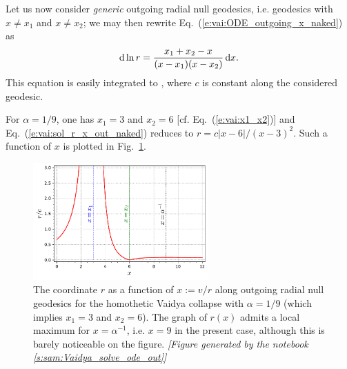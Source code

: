 Let us now consider \emph{generic} outgoing radial null geodesics, i.e.
geodesics with
$x\neq x_1$ and $x \neq x_2$; we may then rewrite Eq.~(\ref{e:vai:ODE_outgoing_x_naked}) as
\[
    \mathrm{d} \ln r = \frac{x_1 + x_2 - x}{(x - x_1)(x - x_2)} \, \mathrm{d} x .
\]
This equation is easily integrated to
\be \label{e:vai:sol_r_x_out_naked}
   ,
\ee
where $c$ is constant along the considered geodesic.

\begin{example} \label{x:vai:sol_out_1o9}
For $\alpha=1/9$, one has $x_1 = 3$ and $x_2 = 6$ [cf. Eq.~(\ref{e:vai:x1_x2})]
and Eq.~(\ref{e:vai:sol_r_x_out_naked}) reduces to
$r = c |x - 6|/(x - 3)^2$. Such a function of $x$ is
plotted in Fig.~\ref{f:vai:r_x_naksing}.
\end{example}

\begin{figure}
\centerline{\includegraphics[width=0.6\textwidth]{vai_r_x_naksing.pdf}}
\caption[]{\label{f:vai:r_x_naksing} \footnotesize
The coordinate $r$ as a function of $x:=v/r$ along outgoing radial
null geodesics for the homothetic Vaidya collapse with
$\alpha = 1/9$ (which implies $x_1 = 3$ and $x_2 = 6$).
The graph of $r(x)$ admits a local
maximum for $x=\alpha^{-1}$, i.e. $x=9$ in the present case, although this
is barely noticeable on the figure.
\textsl{[Figure generated by the notebook \ref{s:sam:Vaidya_solve_ode_out}]}
}
\end{figure}

